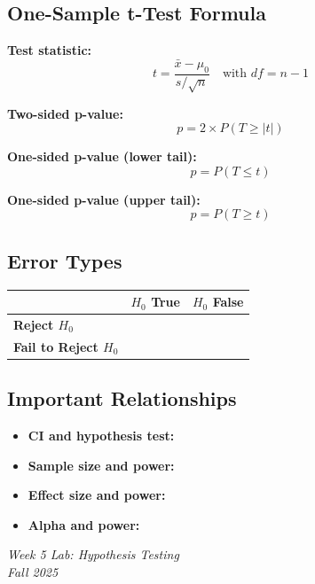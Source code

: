 \documentclass[11pt]{article}
\begin{document}
\subsection*{One-Sample t-Test Formula}

\textbf{Test statistic:}
$$t = \frac{\bar{x} - \mu_0}{s / \sqrt{n}} \quad \text{with } df = n - 1$$

\textbf{Two-sided p-value:}
$$p = 2 \times P(T \geq |t|)$$

\textbf{One-sided p-value (lower tail):}
$$p = P(T \leq t)$$

\textbf{One-sided p-value (upper tail):}
$$p = P(T \geq t)$$

\subsection*{Error Types}

\begin{center}
\begin{tabular}{lcc}
\toprule
& \textbf{$H_0$ True} & \textbf{$H_0$ False} \\
\midrule
\textbf{Reject $H_0$} & & \\
\textbf{Fail to Reject $H_0$} & & \\
\bottomrule
\end{tabular}
\end{center}

\subsection*{Important Relationships}

\begin{itemize}
\item \textbf{CI and hypothesis test:}
\item \textbf{Sample size and power:}
\item \textbf{Effect size and power:}
\item \textbf{Alpha and power:}
\end{itemize}

\vspace{2cm}

\noindent\textit{Week 5 Lab: Hypothesis Testing}\\
\noindent\textit{Fall 2025}
\end{document}
